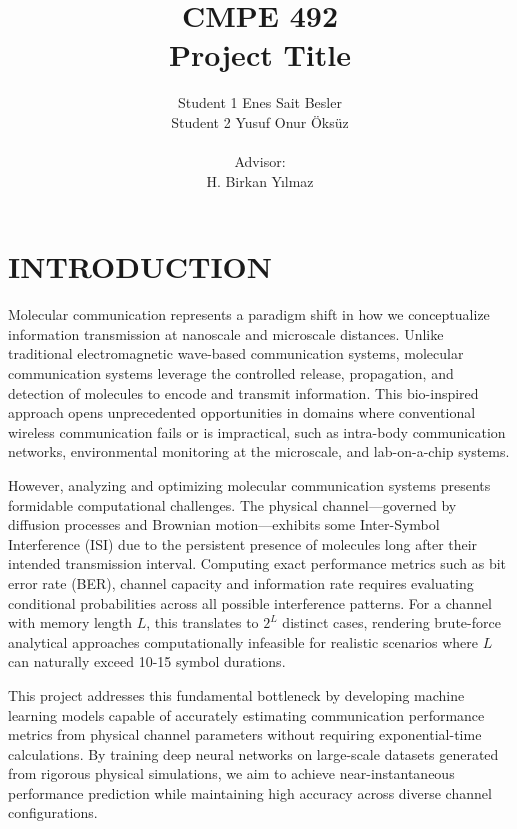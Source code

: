 \documentclass[a4paper,12pt]{report}
\begin{document}
\title{CMPE 492 \\ Project Title}
\author{
Student 1 Enes Sait Besler \\
Student 2 Yusuf Onur Öksüz \\ \\
Advisor: \\ 
H. Birkan Yılmaz
}
\date{}
\maketitle{}
\tableofcontents

\chapter{INTRODUCTION}

Molecular communication represents a paradigm shift in how we conceptualize information transmission at nanoscale and microscale distances. Unlike traditional electromagnetic wave-based communication systems, molecular communication systems leverage the controlled release, propagation, and detection of molecules to encode and transmit information. This bio-inspired approach opens unprecedented opportunities in domains where conventional wireless communication fails or is impractical, such as intra-body communication networks, environmental monitoring at the microscale, and lab-on-a-chip systems.

However, analyzing and optimizing molecular communication systems presents formidable computational challenges. The physical channel—governed by diffusion processes and Brownian motion—exhibits some Inter-Symbol Interference (ISI) due to the persistent presence of molecules long after their intended transmission interval. Computing exact performance metrics such as bit error rate (BER), channel capacity and information rate requires evaluating conditional probabilities across all possible interference patterns. For a channel with memory length $L$, this translates to $2^L$ distinct cases, rendering brute-force analytical approaches computationally infeasible for realistic scenarios where $L$ can naturally exceed 10-15 symbol durations.

This project addresses this fundamental bottleneck by developing machine learning models capable of accurately estimating communication performance metrics from physical channel parameters without requiring exponential-time calculations. By training deep neural networks on large-scale datasets generated from rigorous physical simulations, we aim to achieve near-instantaneous performance prediction while maintaining high accuracy across diverse channel configurations.
\end{document}
